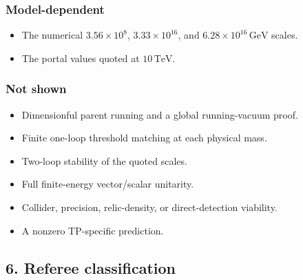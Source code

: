 \documentclass[
]{article}
\providecommand{\tightlist}{%
  \setlength{\itemsep}{0pt}\setlength{\parskip}{0pt}}
\begin{document}
\hypertarget{model-dependent}{%
\subsubsection{Model-dependent}\label{model-dependent}}

\begin{itemize}
\tightlist
\item
  The numerical \(3.56\times10^8\), \(3.33\times10^{16}\), and
  \(6.28\times10^{16}\,\mathrm{GeV}\) scales.
\item
  The portal values quoted at \(10\,\mathrm{TeV}\).
\end{itemize}

\hypertarget{not-shown}{%
\subsubsection{Not shown}\label{not-shown}}

\begin{itemize}
\tightlist
\item
  Dimensionful parent running and a global running-vacuum proof.
\item
  Finite one-loop threshold matching at each physical mass.
\item
  Two-loop stability of the quoted scales.
\item
  Full finite-energy vector/scalar unitarity.
\item
  Collider, precision, relic-density, or direct-detection viability.
\item
  A nonzero TP-specific prediction.
\end{itemize}

\hypertarget{referee-classification}{%
\subsection{6. Referee classification}\label{referee-classification}}
\end{document}

